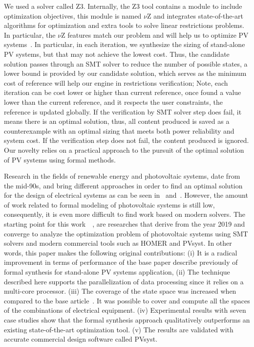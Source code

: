 \documentclass[10pt,journal,compsoc]{IEEEtran}
\begin{document}
 
We used a solver called Z3. Internally, the Z3 tool contains a module to include optimization objectives, this module is named $\nu$Z and integrates state-of-the-art algorithms for optimization and extra tools to solve linear restrictions problems. In particular, the $\nu$Z features match our problem and will help us to optimize PV systems~\cite{BjornerPF15}.
In particular, in each iteration, we synthesize the sizing of stand-alone PV systems, but that may not achieve the lowest cost. Thus, the candidate solution passes through an SMT solver to reduce the number of possible states, a lower bound is provided by our candidate solution, which serves as the minimum cost of reference will help our engine in restrictions verification; Note, each iteration can be cost lower or higher than current reference, once found a value lower than the current reference, and it respects the user constraints, the reference is updated globally. 
If the verification by SMT solver step does fail, it means there is an optimal solution, thus, all content produced is saved as a counterexample with an optimal sizing that meets both power reliability and system cost. If the verification step does not fail, the content produced is ignored. Our novelty relies on a practical approach to the pursuit of the optimal solution of PV systems using formal methods. 

Research in the fields of renewable energy and photovoltaic systems, date from the mid-90s, and bring different approaches in order to find an optimal solution for the design of electrical systems as can be seen in~\cite{Driouich2018} and~\cite{Applasamy2011}. However, the amount of work related to formal modeling of photovoltaic systems is still low, consequently, it is even more difficult to find work based on modern solvers. The starting point for this work~\cite{VSTTE2020}~\cite{TrindadeCordeiro19}, are researches that derive from the year 2019 and converge to analyze the optimization problem of photovoltaic systems using SMT solvers and modern commercial tools such as HOMER and PVsyst. In other words, this paper makes the following original contributions: (i) It is a radical improvement in terms of performance of the base paper describe previously of formal synthesis for stand-alone PV systems application, (ii) The technique described here supports the parallelization of data processing since it relies on a multi-core processor. (iii) The coverage of the state space was increased when compared to the base article~\cite{VSTTE2020}. It was possible to cover and compute all the spaces of the combinations of electrical equipment. (iv) Experimental results with seven case studies show that the formal synthesis approach qualitatively outperforms an existing state-of-the-art optimization tool. (v) The results are validated with accurate commercial design software called PVsyst.
\end{document}
